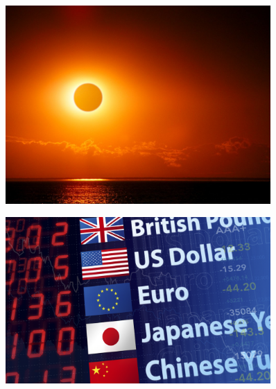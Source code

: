 \documentclass[10pt]{beamer}
\begin{document}
\begin{frame}
\begin{minipage}{0.3\textwidth}
\begin{figure}
\begin{center}
\end{center}
\end{figure}
\end{minipage}
\begin{minipage}{0.3\textwidth}
\pause
\begin{figure}
\begin{center}
    \includegraphics[width=0.9\textwidth]{Imagen3.JPG}
\end{center}
\end{figure}
\end{minipage}
\begin{minipage}{0.3\textwidth}
\pause
\begin{figure}
\begin{center}
    \includegraphics[width=0.9\textwidth]{Imagen4.png}
\end{center}
\end{figure}
\end{minipage}
\begin{minipage}{0.34\textwidth}

\end{minipage}
\end{frame}
\end{document}
